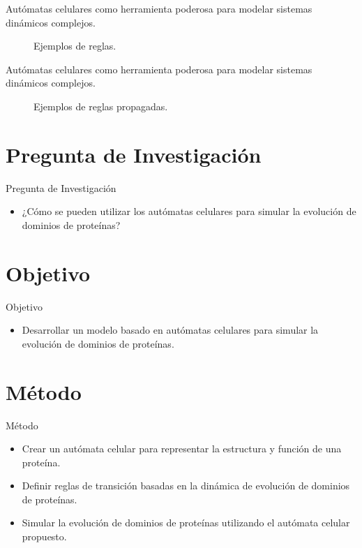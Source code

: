 \documentclass{beamer}
\begin{document}
\begin{frame}{Autómatas celulares como herramienta poderosa para modelar sistemas dinámicos complejos.}
\begin{figure}[ht]

\caption{Ejemplos de reglas.}
\label{fig:CA.svg}
\end{figure}
\end{frame}

\begin{frame}{Autómatas celulares como herramienta poderosa para modelar sistemas dinámicos complejos.}
\begin{figure}[ht]
\centering

\caption{Ejemplos de reglas propagadas.}
\label{fig:CA2.svg}
\end{figure}
\end{frame}

\section{Pregunta de Investigación}
\begin{frame}{Pregunta de Investigación}
\begin{itemize}
\item ¿Cómo se pueden utilizar los autómatas celulares para simular la evolución de dominios de proteínas?
\end{itemize}
\end{frame}

\section{Objetivo}
\begin{frame}{Objetivo}
\begin{itemize}
\item Desarrollar un modelo basado en autómatas celulares para simular la evolución de dominios de proteínas.
\end{itemize}
\end{frame}

\section{Método}
\begin{frame}{Método}
\begin{itemize}
\item Crear un autómata celular para representar la estructura y función de una proteína.
\item Definir reglas de transición basadas en la dinámica de evolución de dominios de proteínas.
\item Simular la evolución de dominios de proteínas utilizando el autómata celular propuesto.
\end{itemize}
\end{frame}
\end{document}
